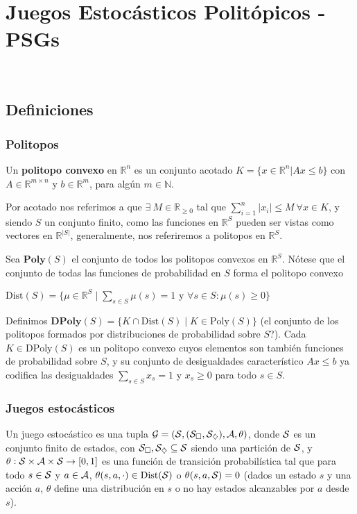 \chapter{Juegos Estocásticos Politópicos - PSGs}
~\label{cap:psg}

\section{Definiciones}

\subsection{Politopos}

Un \textbf{politopo convexo} en $\mathbb{R}^n$ es un conjunto acotado $K = \{ x
	\in \mathbb{R}^n | Ax \leq b\}$ con $A \in \mathbb{R}^{m\times n}$ y $ b \in
	\mathbb{R}^m$, para algún $m \in \mathbb{N}$.

Por acotado nos referimos a que $\exists \ M \in \mathbb{R}_{\geq 0}$ tal que
$\sum_{i=1}^{n} |x_i| \leq M \ \forall x \in K$, y siendo $S$ un conjunto
finito, como las funciones en $\mathbb{R}^S$ pueden ser vistas como vectores en
$\mathbb{R}^{|S|}$, generalmente, nos referiremos a politopos en
$\mathbb{R}^S$.

Sea \( \textbf{Poly}(S) \) el conjunto de todos los politopos convexos en \(
\mathbb{R}^S \). Nótese que el conjunto de todas las funciones de probabilidad
en \( S \) forma el politopo convexo

\( \text{Dist}(S) = \{ \mu \in \mathbb{R}^S \mid \sum_{s \in S} \mu(s) = 1 \text{ y } \forall s \in S : \mu(s) \geq 0 \} \)

Definimos \( \textbf{DPoly}(S) = \{ K \cap \text{Dist}(S) \mid K \in
\text{Poly}(S) \} \) (el conjunto de los politopos formados por distribuciones
de probabilidad sobre $S$?). Cada \( K \in \text{DPoly}(S) \) es un politopo
convexo cuyos elementos son también funciones de probabilidad sobre \( S \), y
su conjunto de desigualdades característico \( Ax \leq b \) ya codifica las
desigualdades \( \sum_{s \in S} x_s = 1 \) y \( x_s \geq 0 \) para todo \( s
\in S \).

\subsection{Juegos estocásticos}

Un juego estocástico es una tupla \( \mathcal{G} = (\mathcal{S}, (\mathcal{S}_\square,
\mathcal{S}_\diamondsuit), \mathcal{A}, \theta) \), donde \( \mathcal{S} \) es un conjunto finito de
estados, con \( \mathcal{S}_\square, \mathcal{S}_\diamondsuit \subseteq \mathcal{S} \) siendo una
partición de \( \mathcal{S} \), y \( \theta : \mathcal{S} \times \mathcal{A} \times \mathcal{S} \to [0, 1] \)
es una función de transición probabilística tal que para todo \( s \in \mathcal{S} \) y
\( a \in \mathcal{A} \), \( \theta(s, a, \cdot) \in \text{Dist}(\mathcal{S}) \) o \( \theta(s,
a, \mathcal{S}) = 0 \) (dados un estado $s$ y una acción $a$, $\theta$ define una
distribución en $s$ o no hay estados alcanzables por $a$ desde $s$).

